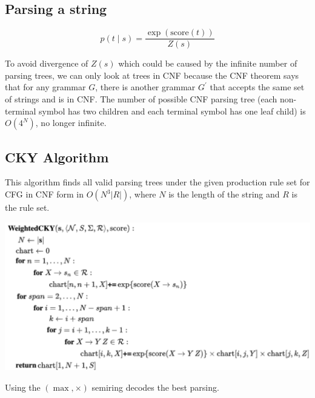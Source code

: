 \subsection*{Parsing a string}

$$p(t\mid s) = \frac{\exp(\text{score}(t))}{Z(s)}$$

To avoid divergence of $Z(s)$ which could be caused by the infinite number of parsing trees, we can only look at trees in CNF because the CNF theorem says that for any grammar $G$, there is another grammar $G^\prime$ that accepts the same set of strings and is in CNF. The number of possible CNF parsing tree (each non-terminal symbol has two children and each terminal symbol has one leaf child) is $O(4^N)$, no longer infinite.

\subsection*{CKY Algorithm}

This algorithm finds all valid parsing trees under the given production rule set for CFG in CNF form in $O(N^3 |R|)$, where $N$ is the length of the string and $R$ is the rule set.
\begin{center}
    \includegraphics[width=\columnwidth]{img/CKY.png}
\end{center}

Using the $(\max, \times)$ semiring decodes the best parsing.